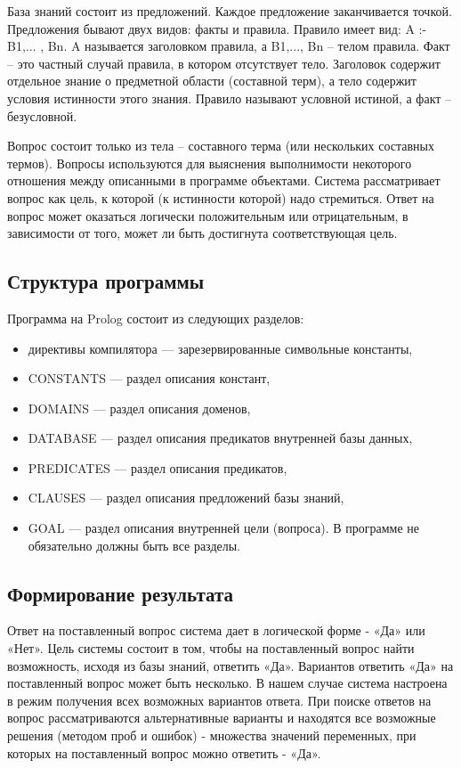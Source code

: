 \documentclass[a4paper,12pt]{article}
\begin{document}
База знаний состоит из предложений. Каждое предложение заканчивается точкой. Предложения бывают двух видов: факты и правила. Правило имеет вид: A :- B1,... , Bn. 
A называется заголовком правила, а B1,..., Bn – телом правила.
Факт – это частный случай правила, в котором отсутствует тело. Заголовок содержит отдельное знание о предметной области (составной терм), а тело содержит условия истинности этого знания. Правило называют условной истиной, а факт – безусловной.

Вопрос состоит только из тела – составного терма (или нескольких составных термов). Вопросы используются для выяснения выполнимости некоторого отношения между описанными в программе объектами. Система рассматривает вопрос как цель, к которой (к истинности которой) надо стремиться. Ответ на вопрос может оказаться логически положительным или отрицательным, в зависимости от того, может ли быть достигнута соответствующая цель.

\subsection*{Структура программы}

Программа на Prolog состоит из следующих разделов:
\begin{itemize}
	\item директивы компилятора — зарезервированные символьные константы,
	\item CONSTANTS — раздел описания констант,
	\item DOMAINS — раздел описания доменов,
	\item DATABASE — раздел описания предикатов внутренней базы данных,
	\item PREDICATES — раздел описания предикатов,
	\item CLAUSES — раздел описания предложений базы знаний,
	\item GOAL — раздел описания внутренней цели (вопроса).
В программе не обязательно должны быть все разделы.
\end{itemize}

\subsection*{Формирование результата}

Ответ на поставленный вопрос система дает в логической форме - «Да» или «Нет». Цель системы состоит в том, чтобы на поставленный вопрос найти возможность, исходя из базы знаний, ответить «Да». Вариантов ответить «Да» на поставленный вопрос может быть несколько. В нашем случае система настроена в режим получения всех возможных вариантов ответа. При поиске ответов на вопрос рассматриваются альтернативные варианты и находятся все возможные решения (методом проб и ошибок) - множества значений переменных, при которых на поставленный вопрос можно ответить - «Да».
\end{document}
